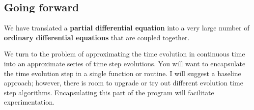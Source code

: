 \documentclass[11pt,letterpaper]{article}
\begin{document}
	\subsection{Going forward}
	\begin{description}[leftmargin=6em,style=nextline]
		\item[So far] We have translated a \textbf{partial differential equation} into a very large number of \textbf{ordinary differential equations} that are coupled together.
		\item[Next] We turn to the problem of approximating the time evolution in continuous time into an approximate series of time step evolutions. You will want to encapsulate the time evolution step in a single function or routine. I will suggest a baseline approach; however, there is room to upgrade or try out different evolution time step algorithms. Encapsulating this part of the program will facilitate experimentation.
	\end{description}
\end{document}
